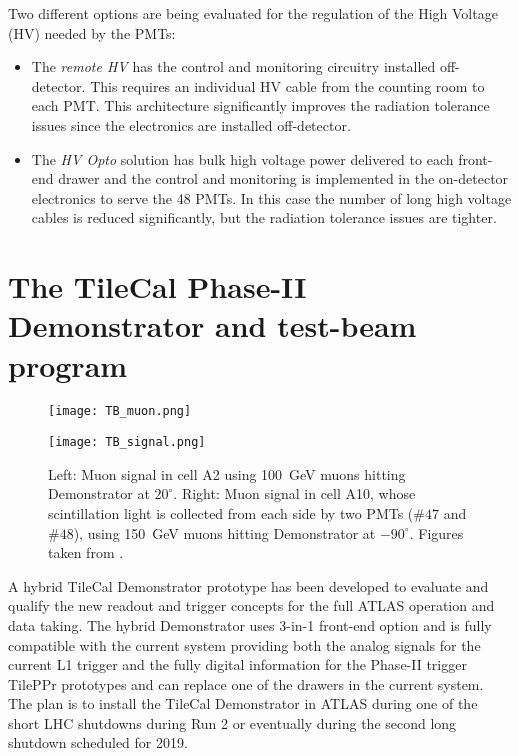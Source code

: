 \documentclass[10pt]{article}
\begin{document}
Two different options are being evaluated for the regulation of the High Voltage (HV) needed by the PMTs: 
\begin{itemize}
\item The \emph{remote HV} has the control and monitoring circuitry installed off-detector. This requires an individual HV cable from the counting room to each PMT. This architecture significantly improves the radiation tolerance issues since the electronics are installed off-detector. 
\item The \emph{HV Opto} solution has bulk high voltage power delivered to each front-end drawer and the control and monitoring is implemented in the on-detector electronics to serve the 48 PMTs. In this case the number of long high voltage cables is reduced significantly, but the radiation tolerance issues are tighter. 
\end{itemize}


\section{The TileCal Phase-II Demonstrator and test-beam program}

\begin{figure}[h]
\centering
\begin{minipage}[c]{0.45\textwidth}
\texttt{[image: TB\_muon.png]}
\end{minipage}
\hspace{5mm}
\begin{minipage}[c]{0.45\textwidth}
\texttt{[image: TB\_signal.png]}
\end{minipage}
\caption{Left: Muon signal in cell A2 using 100~GeV muons hitting Demonstrator at $20^{\circ}$. Right: Muon signal in cell A10, whose scintillation light is collected from each side by two PMTs ($\#47$ and $\#48$), using 150~GeV muons hitting Demonstrator at $-90^{\circ}$. Figures taken from \cite{Tile}.}
\label{fig:figure3}
\end{figure}

A hybrid TileCal Demonstrator prototype has been developed to evaluate and qualify the new readout and trigger concepts for the full ATLAS operation and data taking. The hybrid Demonstrator uses 3-in-1 front-end option and is fully compatible with the current system providing both the analog signals for the current L1 trigger and the fully digital information for the Phase-II trigger TilePPr prototypes and can replace one of the drawers in the current system. The plan is to install the TileCal Demonstrator in ATLAS during one of the short LHC shutdowns during Run 2 or eventually during the second long shutdown scheduled for 2019. 
\end{document}
